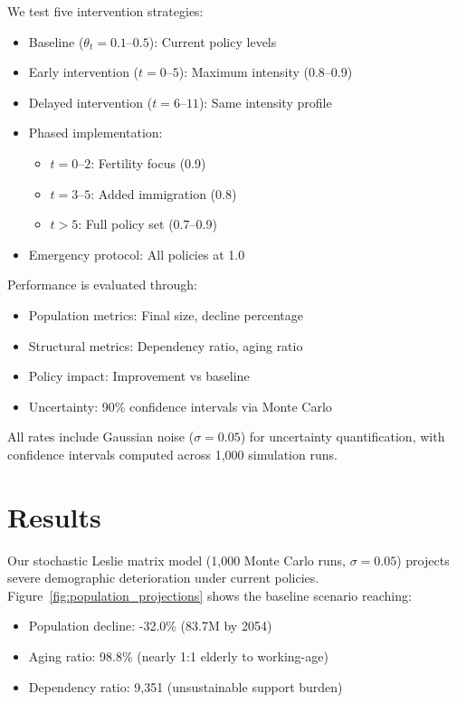 \documentclass{article} %
\begin{document}
We test five intervention strategies:
\begin{itemize}
    \item Baseline ($\theta_t = 0.1$--$0.5$): Current policy levels
    \item Early intervention ($t = 0$--$5$): Maximum intensity (0.8--0.9)
    \item Delayed intervention ($t = 6$--$11$): Same intensity profile
    \item Phased implementation:
        \begin{itemize}
            \item $t = 0$--$2$: Fertility focus (0.9)
            \item $t = 3$--$5$: Added immigration (0.8)
            \item $t > 5$: Full policy set (0.7--0.9)
        \end{itemize}
    \item Emergency protocol: All policies at 1.0
\end{itemize}

Performance is evaluated through:
\begin{itemize}
    \item Population metrics: Final size, decline percentage
    \item Structural metrics: Dependency ratio, aging ratio
    \item Policy impact: Improvement vs baseline
    \item Uncertainty: 90\% confidence intervals via Monte Carlo
\end{itemize}

All rates include Gaussian noise ($\sigma = 0.05$) for uncertainty quantification, with confidence intervals computed across 1,000 simulation runs.

\section{Results}
\label{sec:results}

Our stochastic Leslie matrix model (1,000 Monte Carlo runs, $\sigma = 0.05$) projects severe demographic deterioration under current policies. Figure~\ref{fig:population_projections} shows the baseline scenario reaching:
\begin{itemize}
    \item Population decline: -32.0\% (83.7M by 2054)
    \item Aging ratio: 98.8\% (nearly 1:1 elderly to working-age)
    \item Dependency ratio: 9,351 (unsustainable support burden)
\end{itemize}
\end{document}
